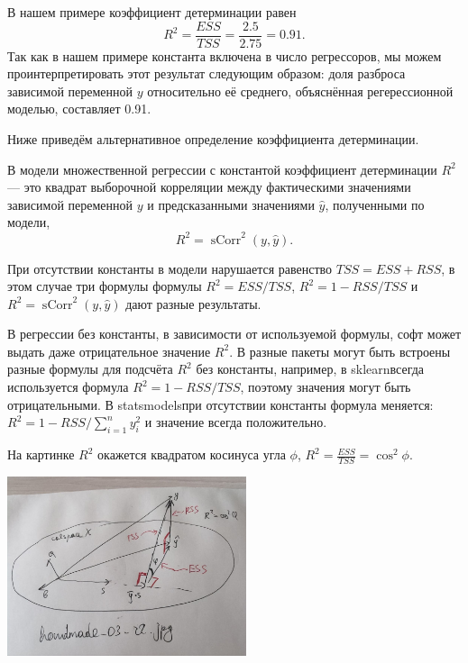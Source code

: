 \documentclass[12pt]{article}
\DeclareMathOperator{\sCorr}{sCorr}
\newcommand{\hy}{\hat{y}}
\newcommand{\RSS}{RSS}
\newcommand{\ESS}{ESS}
\newcommand{\TSS}{TSS}
\newcommand{\sklearn}{sklearn}
\newcommand{\statsmodels}{statsmodels}
\begin{document}
В нашем примере коэффициент детерминации равен
\[
R^2 = \frac{\ESS}{\TSS} = \frac{2.5}{2.75} = 0.91.
\]
Так как в нашем примере константа включена в число регрессоров, мы можем проинтерпретировать этот результат следующим образом: доля разброса зависимой переменной $y$ относительно её среднего, объяснённая регерессионной моделью, составляет 0.91.

Ниже приведём альтернативное определение коэффициента детерминации.

\begin{definition} В модели множественной регрессии с константой коэффициент детерминации $R^2$ — это квадрат выборочной корреляции между фактическими значениями зависимой переменной $y$ и предсказанными значениями $\hat{y}$, полученными по модели, 
\[
R^2 = \sCorr^2(y, \hy).
\]
\end{definition}

При отсутствии константы в модели нарушается равенство $\TSS = \ESS + \RSS$, в этом случае три формулы формулы $R^2 = \ESS/\TSS$, $R^2 = 1 - \RSS/\TSS$ и 
$R^2 = \sCorr^2(y, \hy)$ дают разные результаты.

В регрессии без константы, в зависимости от используемой формулы, софт может выдать даже отрицательное значение $R^2$.
В разные пакеты могут быть встроены разные формулы для подсчёта $R^2$ без константы, например, в \sklearn всегда используется формула $R^2 = 1 - \RSS/\TSS$, поэтому значения могут быть отрицательными. В \statsmodels при отсутствии константы формула меняется: $R^2 = 1 - \RSS/\sum_{i=1}^n y_i^2$ и значение всегда положительно.  

На картинке $R^2$ окажется квадратом косинуса угла $\phi$, $R^2 = \frac{ESS}{TSS} = \cos^2 \phi$.

\begin{minipage}{\textwidth}
\includegraphics[width=7cm]{handmade/handmade_03_r2.jpg}
\end{minipage}
\end{document}
